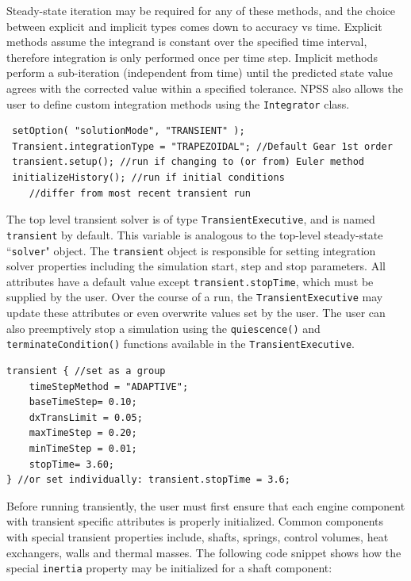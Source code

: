\documentclass[heading.tex]{subfiles}
\begin{document}
Steady-state iteration may be required for any of these methods, and the choice between explicit
and implicit types comes down to accuracy vs time. Explicit methods assume the integrand is
constant over the specified time interval, therefore integration is only performed once per time
step. Implicit methods perform a sub-iteration (independent from time) until the predicted state
value agrees with the corrected value within a specified tolerance. NPSS also allows the user to
define custom integration methods using the \texttt{Integrator} class. \cite[chap.~15.2]{NPSS}  

\begin{adjustwidth}{-0.5cm}{-0.5cm}
 \begin{verbatim}
 setOption( "solutionMode", "TRANSIENT" );
 Transient.integrationType = "TRAPEZOIDAL"; //Default Gear 1st order
 transient.setup(); //run if changing to (or from) Euler method
 initializeHistory(); //run if initial conditions 
 	//differ from most recent transient run
 \end{verbatim}
 \end{adjustwidth} 
       

The top level transient solver is of type \texttt{TransientExecutive}, and is named
\texttt{transient} by default. This variable is analogous to the top-level steady-state 
``\texttt{solver}" object. The \texttt{transient} object is responsible for setting integration
solver properties including the simulation start, step and stop parameters. \cite[chap.~7.5]{NPSS}
\cite[chap.~15.1.8]{NPSS}  All attributes have a default value except \texttt{transient.stopTime},
which must be supplied by the user. Over the course of a run, the \texttt{TransientExecutive} may
update these attributes or even overwrite values set by the user. The user can also preemptively
stop a simulation using the  \texttt{quiescence()} and  \texttt{terminateCondition()} functions
available in the \texttt{TransientExecutive}.

\begin{adjustwidth}{0cm}{0cm}
 \begin{verbatim}
transient { //set as a group
	timeStepMethod = "ADAPTIVE";
	baseTimeStep= 0.10;
	dxTransLimit = 0.05;
	maxTimeStep = 0.20;
	minTimeStep = 0.01;
	stopTime= 3.60;
} //or set individually: transient.stopTime = 3.6;
 \end{verbatim}
 \end{adjustwidth} 

Before running transiently, the user must first ensure that each engine component with transient
specific attributes is properly initialized. Common components with special transient properties
include, shafts, springs, control volumes, heat exchangers, walls and thermal masses.
The following code snippet shows how the special \texttt{inertia} property may be initialized
for a shaft component:
\end{document}
